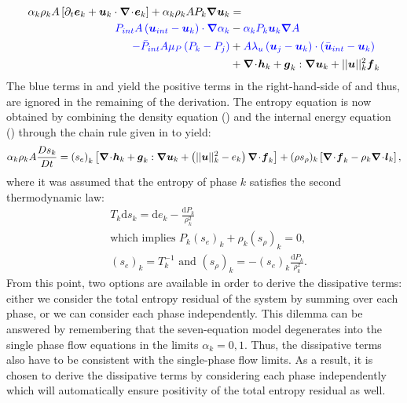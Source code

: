 %
\begin{align}\label{eq:int-ener-7-eqn-model-sect4}
\alpha_k \rho_k  A \left[ \partial_t \boldsymbol e_k + \boldsymbol u_k \cdot \boldsymbol{\nabla}\! \cdot \! \boldsymbol e_k \right]  + \alpha_k \rho_k A P_k \boldsymbol{\nabla} \boldsymbol u_k &=\nonumber\\
\textcolor{blue}{P_{int} A \left(\boldsymbol u_{int}-\boldsymbol u_k \right) \cdot \boldsymbol{\nabla} \alpha_k} &-  \textcolor{blue}{\alpha_k P_k \boldsymbol u_k \boldsymbol{\nabla} A} \nonumber \\ 
\textcolor{blue}{-\bar{P}_{int} A \mu_P \left(P_k-P_j \right)} &+ \textcolor{blue}{A \lambda_u \left(\boldsymbol u_j-\boldsymbol u_k  \right) \cdot \left(\bar{\boldsymbol u}_{int}- \boldsymbol u_k \right)}\nonumber \\
&+ \boldsymbol{\nabla}\! \cdot \! \boldsymbol h_k + \boldsymbol g_k : \boldsymbol{\nabla} \boldsymbol u_k + || \boldsymbol u ||^2_k \boldsymbol f_k
\end{align}
%
The blue terms in  and  yield the positive terms in the right-hand-side of  and thus, are ignored in the remaining of the derivation. The entropy equation is now obtained by combining the density equation () and the internal energy equation () through the chain rule given in  to yield:
%
\begin{equation}\label{eq:ent-res-7-eqn-diss-terms}
\alpha_k \rho_k A \frac{Ds_k}{Dt} = \left(s_e\right)_k \left[ \div \mbold h_k + \mbold g_k : \grad \mbold u_k +  \left( || \mbold u ||^2_k - e_k\right) \div \mbold f_k  \right] + (\rho s_\rho)_k \left[ \div \mbold f_k - \rho_k \div \mbold l_k \right],
\end{equation}
%
where it was assumed that the entropy of phase $k$ satisfies the second thermodynamic law: 
%
\begin{align}\label{eq:2nd-therm-laws-sect4}
&T_k \text{d} s_k = \text{d}e_k - \frac{\text{d}P_k}{\rho_k^2} \nonumber \\
& \text{which implies } P_k (s_e)_k + \rho_k (s_\rho)_k = 0, \\
& (s_e)_k = T_k^{-1} \text{ and } (s_\rho)_k = - (s_e)_k \frac{\text{d}P_k}{\rho_k^2}. \nonumber
\end{align}
% 
From this point, two options are available in order to derive the dissipative terms: either we consider the total entropy residual of the system by summing  over each phase, or we can consider each phase independently. This dilemma can be answered by remembering that the seven-equation model degenerates into the single phase flow equations in the limits $\alpha_k = 0,1$. Thus, the dissipative terms also have to be consistent with the single-phase flow limits. As a result, it is chosen to derive the dissipative terms by considering each phase independently which will automatically ensure positivity of the total entropy residual as well.

